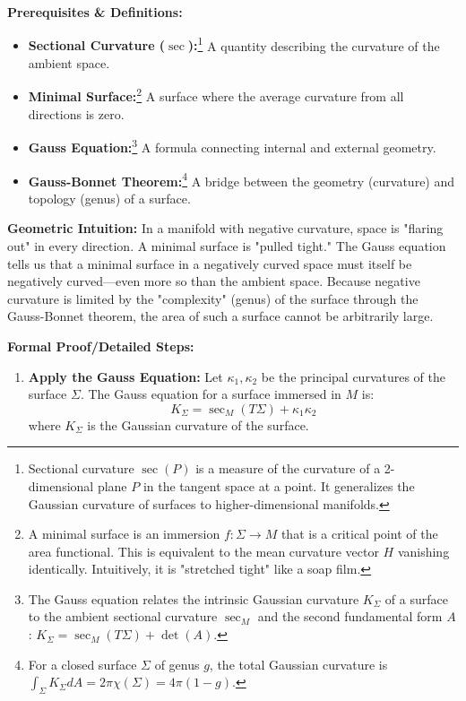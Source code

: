 \begin{solution}
\textbf{Prerequisites \& Definitions:}
\begin{itemize}
    \item \textbf{Sectional Curvature ($\sec$):}\footnote{Sectional curvature $\sec(P)$ is a measure of the curvature of a 2-dimensional plane $P$ in the tangent space at a point. It generalizes the Gaussian curvature of surfaces to higher-dimensional manifolds.} A quantity describing the curvature of the ambient space.
    \item \textbf{Minimal Surface:}\footnote{A minimal surface is an immersion $f: \Sigma \to M$ that is a critical point of the area functional. This is equivalent to the mean curvature vector $H$ vanishing identically. Intuitively, it is "stretched tight" like a soap film.} A surface where the average curvature from all directions is zero.
    \item \textbf{Gauss Equation:}\footnote{The Gauss equation relates the intrinsic Gaussian curvature $K_\Sigma$ of a surface to the ambient sectional curvature $\sec_M$ and the second fundamental form $A$: $K_\Sigma = \sec_M(T\Sigma) + \det(A)$.} A formula connecting internal and external geometry.
    \item \textbf{Gauss-Bonnet Theorem:}\footnote{For a closed surface $\Sigma$ of genus $g$, the total Gaussian curvature is $\int_\Sigma K_\Sigma dA = 2\pi \chi(\Sigma) = 4\pi(1-g)$.} A bridge between the geometry (curvature) and topology (genus) of a surface.
\end{itemize}

\textbf{Geometric Intuition:}
In a manifold with negative curvature, space is "flaring out" in every direction. A minimal surface is "pulled tight." The Gauss equation tells us that a minimal surface in a negatively curved space must itself be negatively curved—even more so than the ambient space. Because negative curvature is limited by the "complexity" (genus) of the surface through the Gauss-Bonnet theorem, the area of such a surface cannot be arbitrarily large.

\textbf{Formal Proof/Detailed Steps:}
\begin{enumerate}
    \item \textbf{Apply the Gauss Equation:}
    Let $\kappa_1, \kappa_2$ be the principal curvatures of the surface $\Sigma$. The Gauss equation for a surface immersed in $M$ is:
    \[ K_\Sigma = \sec_M(T\Sigma) + \kappa_1 \kappa_2 \]
    where $K_\Sigma$ is the Gaussian curvature of the surface.
    

\end{enumerate}
\end{solution}
